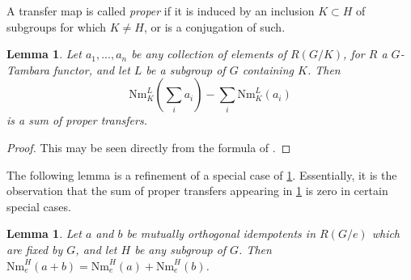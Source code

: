 \documentclass[11pt,dvipsnames]{amsart}
\newtheorem{lemma}[theorem]{Lemma}
\theoremstyle{BoldRemark}
\begin{document}
A transfer map is called \emph{proper} if it is induced by an inclusion $K \subset H$ of subgroups for which $K \neq H$, or is a conjugation of such.

\begin{lemma}\label{lem:norm-is-additive-up-to-proper-transfers}
	Let $a_1,...,a_n$ be any collection of elements of $R(G/K)$, for $R$ a $G$-Tambara functor, and let $L$ be a subgroup of $G$ containing $K$. Then \[ \mathrm{Nm}_K^L( \sum_i a_i ) - \sum_i \mathrm{Nm}_K^L(a_i) \] is a sum of proper transfers.
\end{lemma}

\begin{proof}
	This may be seen directly from the formula of \cite[Theorem 8.2]{AKGH21}.
\end{proof}

The following lemma is a refinement of a special case of \cref{lem:norm-is-additive-up-to-proper-transfers}. Essentially, it is the observation that the sum of proper transfers appearing in \cref{lem:norm-is-additive-up-to-proper-transfers} is zero in certain special cases.

\begin{lemma}\label{lem:norm-of-idempotents-is-additive}
	Let $a$ and $b$ be mutually orthogonal idempotents in $R(G/e)$ which are fixed by $G$, and let $H$ be any subgroup of $G$. Then $\mathrm{Nm}_e^H(a+b) = \mathrm{Nm}_e^H(a)+\mathrm{Nm}_e^H(b)$.
\end{lemma}
\end{document}
